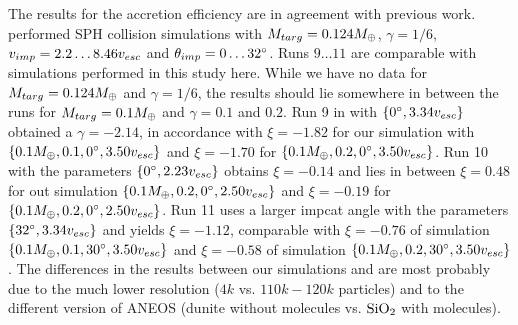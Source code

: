 The results for the accretion efficiency are in agreement with previous work. \cite{Benz:1988p3336} performed SPH collision simulations with $M_{targ} = 0.124 M_{\oplus}$, $\gamma = 1/6$, $v_{imp} = 2.2 \dots 8.46 v_{esc}$ and $\theta_{imp} = 0 \dots 32 ^\circ$. Runs $9 \dots 11$ are comparable with simulations performed in this study here. While we have no data for $M_{targ} = 0.124 M_{\oplus}$ and $\gamma = 1/6$, the results should lie somewhere in between the runs for $M_{targ} = 0.1 M_{\oplus}$ and $\gamma = 0.1$ and $0.2$. Run 9 in  \cite{Benz:1988p3336} with $\{0 ^\circ, 3.34 v_{esc} \}$ obtained a $\gamma = -2.14$, in accordance with $\xi = -1.82$ for our simulation with $\{0.1 M_{\oplus}, 0.1, 0 ^\circ, 3.50 v_{esc} \}$ and $\xi = -1.70$ for $\{0.1 M_{\oplus}, 0.2, 0 ^\circ, 3.50 v_{esc} \}$. Run 10 with the parameters $\{ 0 ^\circ, 2.23 v_{esc} \}$ obtains $\xi = -0.14$ and lies in between $\xi = 0.48$ for out simulation $\{0.1 M_{\oplus}, 0.2, 0 ^\circ, 2.50 v_{esc} \}$ and $\xi = -0.19$ for $\{0.1 M_{\oplus}, 0.2, 0 ^\circ, 2.50 v_{esc} \}$. Run 11 uses a larger impcat angle with the parameters $\{ 32 ^\circ, 3.34 v_{esc} \}$ and yields $\xi = -1.12$, comparable with $\xi = -0.76$ of simulation $\{0.1 M_{\oplus}, 0.1, 30 ^\circ, 3.50 v_{esc} \}$ and $\xi = -0.58$ of simulation $\{0.1 M_{\oplus}, 0.2, 30 ^\circ, 3.50 v_{esc} \}$. The differences in the results between our simulations and  \cite{Benz:1988p3336}  are most probably due to the much lower resolution ($4k$ vs. $110k - 120k$ particles) and to the different version of ANEOS (dunite without molecules vs. $\mathrm{SiO}_2$ with molecules).

